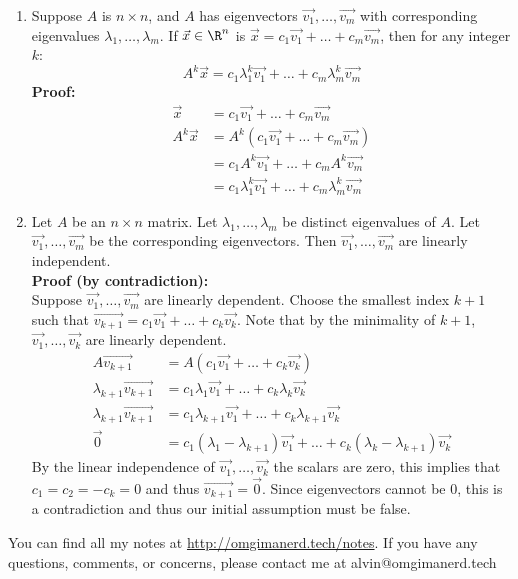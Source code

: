 \documentclass{math}
\begin{document}
\begin{enumerate}[Theorem 1.]
\begin{enumerate}[(i)]
  \end{enumerate}
  \item Suppose \( A \) is \( n\times n \), and \( A \) has eigenvectors
  \( \vec{v_1},\dots,\vec{v_m} \) with corresponding eigenvalues \( \lambda_1,
  \dots,\lambda_m \). If \( \vec{x}\in\R^n \) is \( \vec{x} = c_1\vec{v_1}+
  \dots+c_m\vec{v_m} \), then for any integer \( k \):
  \[ A^k\vec{x} = c_1\lambda_1^k\vec{v_1}+\dots+c_m\lambda_m^k\vec{v_m} \]
  \textbf{Proof:}
  \begin{align*}
    \vec{x} &= c_1\vec{v_1}+\dots+c_m\vec{v_m} \\
    A^k\vec{x} &= A^k(c_1\vec{v_1}+\dots+c_m\vec{v_m}) \\
    &= c_1A^k\vec{v_1}+\dots+c_mA^k\vec{v_m} \\
    &= c_1\lambda_1^k\vec{v_1}+\dots+c_m\lambda_m^k\vec{v_m}
  \end{align*}
  \item Let \( A \) be an \( n\times n \) matrix. Let \( \lambda_1,\dots,
  \lambda_m \) be distinct eigenvalues of \( A \). Let \( \vec{v_1},\dots,
  \vec{v_m} \) be the corresponding eigenvectors. Then \( \vec{v_1},\dots,
  \vec{v_m} \) are linearly independent. \\
  \textbf{Proof (by contradiction):} \\
  Suppose \( \vec{v_1},\dots,\vec{v_m} \) are linearly dependent. Choose the
  smallest index \( k+1 \) such that \( \overrightarrow{v_{k+1}} =
  c_1\vec{v_1}+\dots+c_k\vec{v_k} \). Note that by the minimality of \( k+1 \),
  \( \vec{v_1}, \dots,\vec{v_k} \) are linearly dependent.
  \begin{align*}
    A\overrightarrow{v_{k+1}} &= A(c_1\vec{v_1}+\dots+c_k\vec{v_k}) \\
    \lambda_{k+1}\overrightarrow{v_{k+1}} &=
      c_1\lambda_1\vec{v_1}+\dots+c_k\lambda_k\vec{v_k} \\
    \lambda_{k+1}\overrightarrow{v_{k+1}} &= c_1\lambda_{k+1}\vec{v_1}+\dots+
      c_k\lambda_{k+1}\vec{v_k} \\
    \vec{0} &= c_1(\lambda_1-\lambda_{k+1})\vec{v_1}+\dots+
      c_k(\lambda_k-\lambda_{k+1})\vec{v_k}
  \end{align*}
  By the linear independence of \( \vec{v_1},\dots,\vec{v_k} \) the scalars
  are zero, this implies that \( c_1 = c_2 = -c_k = 0 \) and thus
  \( \overrightarrow{v_{k+1}} = \vec{0} \). Since eigenvectors cannot be 0,
  this is a contradiction and thus our initial assumption must be false.
\end{enumerate}

\begin{center}
  You can find all my notes at \url{http://omgimanerd.tech/notes}. If you have
  any questions, comments, or concerns, please contact me at
  alvin@omgimanerd.tech
\end{center}
\end{document}
